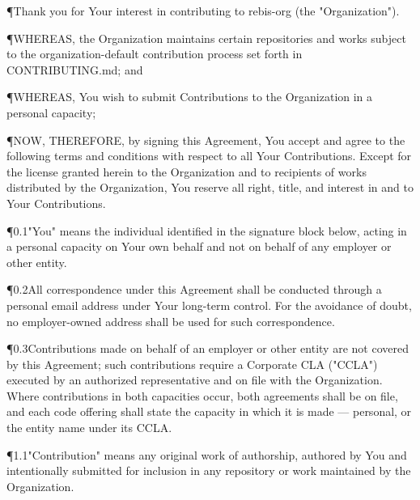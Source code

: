 



\setupagreement
{}


\P{}{Thank you for Your interest in contributing to rebis-org (the "Organization").}

\P{}{WHEREAS, the Organization maintains certain repositories and works subject to the organization-default contribution process set forth in CONTRIBUTING.md; and}

\P{}{WHEREAS, You wish to submit Contributions to the Organization in a personal capacity;}

\P{}{NOW, THEREFORE, by signing this Agreement, You accept and agree to the following terms and conditions with respect to all Your Contributions. Except for the license granted herein to the Organization and to recipients of works distributed by the Organization, You reserve all right, title, and interest in and to Your Contributions.}


\P{0.1}{"You" means the individual identified in the signature block below, acting in a personal capacity on Your own behalf and not on behalf of any employer or other entity.}

\P{0.2}{All correspondence under this Agreement shall be conducted through a personal email address under Your long-term control. For the avoidance of doubt, no employer-owned address shall be used for such correspondence.}

\P{0.3}{Contributions made on behalf of an employer or other entity are not covered by this Agreement; such contributions require a Corporate CLA ("CCLA") executed by an authorized representative and on file with the Organization. Where contributions in both capacities occur, both agreements shall be on file, and each code offering shall state the capacity in which it is made --- personal, or the entity name under its CCLA.}


\P{1.1}{"Contribution" means any original work of authorship, authored by You and intentionally submitted for inclusion in any repository or work maintained by the Organization.}

